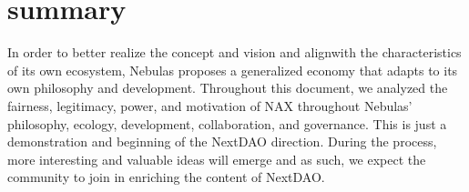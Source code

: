 \section{summary}
In order to better realize the concept and vision and alignwith the characteristics of its own ecosystem, Nebulas proposes a generalized economy that adapts to its own philosophy and development. Throughout this document, we analyzed the fairness, legitimacy, power, and motivation of NAX throughout Nebulas' philosophy, ecology, development, collaboration, and governance. This is just a demonstration and beginning of the NextDAO direction. During the process, more interesting and valuable ideas will emerge and as such, we expect the community to join in enriching the content of NextDAO.

